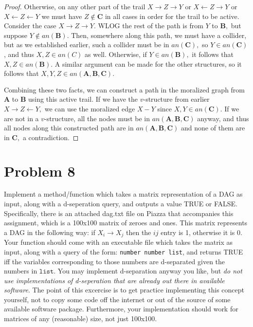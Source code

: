 \documentclass[letterpaper]{article}
\begin{document}
\begin{proof}
    Otherwise, on any other part of the trail $X\to Z\to Y$ or $X\gets Z\to Y$ or $X\gets Z\gets Y$ we must have $Z\not\in\mathbf{C}$ in all cases in order for the trail to be active. Consider the case $X\to Z\to Y.$ WLOG the rest of the path is from $Y$ to $\mathbf{B},$ but suppose $Y\not\in an(\mathbf{B}).$ Then, somewhere along this path, we must have a collider, but as we established earlier, such a collider must be in $an(\mathbf{C}),$ so $Y\in an(\mathbf{C})$, and thus $X, Z\in an(C)$ as well. Otherwise, if $Y\in an(\mathbf{B}),$ it follows that $X, Z\in an(\mathbf{B}).$ A similar argument can be made for the other structures, so it follows that $X, Y, Z\in an(\mathbf{A, B, C}).$
  
    Combining these two facts, we can construct a path in the moralized graph from $\mathbf{A}$ to $\mathbf{B}$ using this active trail. If we have the $v$-structure from earlier $X\to Z\gets Y,$ we can use the moralized edge $X - Y$ since $X, Y\in an(\mathbf{C}).$ If we are not in a $v$-structure, all the nodes must be in $an(\mathbf{A, B, C})$ anyway, and thus all nodes along this constructed path are in $an(\mathbf{A, B, C})$ and none of them are in $\mathbf{C},$ a contradiction.
\end{proof}

\newpage
\newpage
\section*{Problem 8}

Implement a method/function which takes a matrix representation of a DAG as input, along with a d-seperation query, and outputs a value TRUE or FALSE. Specifically, there is an attached dag.txt file on Piazza that accompanies this assignment, which is a 100x100 matrix of zeroes and ones. This matrix represents a DAG in the following way: if $X_i \rightarrow X_j$ then the $ij$ entry is 1, otherwise it is 0. Your function should come with an executable file which takes the matrix as input, along with a query of the form: \texttt{number number list}, and returns TRUE iff the variables corresponding to those numbers are d-separated given the numbers in $\texttt{list}$. You may implement d-separation anyway you like, but \emph{do not use implementations of d-seperation that are already out there in available software}. The point of this excercise is to get practice implementing this concept yourself, not to copy some code off the internet or out of the source of some available software package. Furthermore, your implementation should work for matrices of any (reasonable) size, not just 100x100.\\
\end{document}
